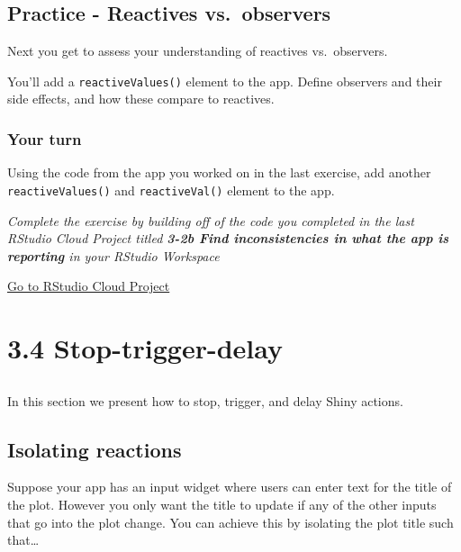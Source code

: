 \documentclass[
  letterpaper,
  DIV=11,
  numbers=noendperiod]{scrreprt}
\begin{document}
\hypertarget{practice---reactives-vs.-observers}{%
\subsection{Practice - Reactives
vs.~observers}\label{practice---reactives-vs.-observers}}

Next you get to assess your understanding of reactives vs.~observers.

You'll add a \texttt{reactiveValues()} element to the app. Define
observers and their side effects, and how these compare to reactives.

\hypertarget{your-turn-23}{%
\subsubsection{Your turn}\label{your-turn-23}}

Using the code from the app you worked on in the last exercise, add
another \texttt{reactiveValues()} and \texttt{reactiveVal()} element to
the app.

\emph{Complete the exercise by building off of the code you completed in
the last RStudio Cloud Project titled \textbf{3-2b Find inconsistencies
in what the app is reporting} in your RStudio Workspace}

\href{https://rstudio.cloud/spaces/81721/join?access_code=I4VJaNsKfTqR3Td9hLP7E1nz8\%2FtMg6Xbw9Bgqumv}{
Go to RStudio Cloud Project}

\hypertarget{stop-trigger-delay}{%
\section{3.4 Stop-trigger-delay}\label{stop-trigger-delay}}

\hypertarget{section-49}{%
\subsection{}\label{section-49}}

In this section we present how to stop, trigger, and delay Shiny
actions.

\hypertarget{isolating-reactions}{%
\subsection{Isolating reactions}\label{isolating-reactions}}

Suppose your app has an input widget where users can enter text for the
title of the plot. However you only want the title to update if any of
the other inputs that go into the plot change. You can achieve this by
isolating the plot title such that\ldots{}
\end{document}

